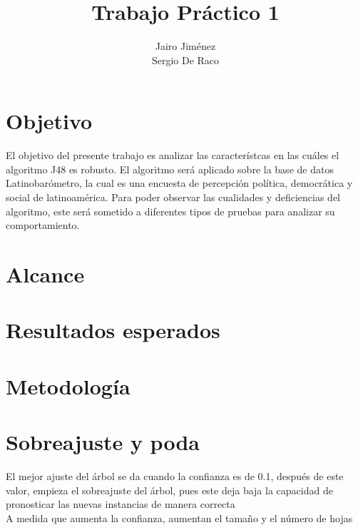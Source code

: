 \documentclass[]{article}
\title{Trabajo Práctico 1}
\author{Jairo Jiménez \\
	Sergio De Raco}
\begin{document}
\maketitle


\section*{Objetivo}
El objetivo del presente trabajo es analizar las característcas en las cuáles el algoritmo J48 es robusto. El algoritmo será aplicado sobre la base de datos Latinobarómetro, la cual es una encuesta de percepción política, democrática y social de latinoamérica. Para poder observar las cualidades y deficiencias del algoritmo, este será sometido a diferentes tipos de pruebas para analizar su comportamiento.

\section*{Alcance}


\section*{Resultados esperados}

\section*{Metodología}

\section{Sobreajuste y poda}

El mejor ajuste del árbol se da cuando la confianza es de 0.1, después de este valor, empieza el sobreajuste del árbol, pues este deja baja la capacidad de pronosticar las nuevas instancias de manera correcta\\
A medida que aumenta la confianza, aumentan el tamaño y el número de hojas

\end{document}
